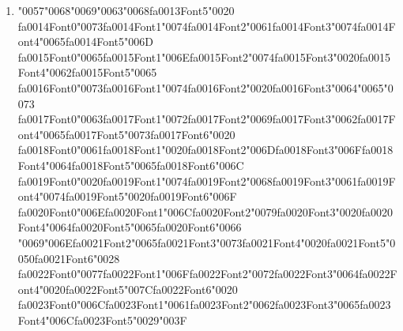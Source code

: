 \documentclass[11pt]{article}
\begin{document}
\begin{enumerate}[label=Q\arabic*., leftmargin=*]
\textbf{A.} Beginning of an entity\\
\textbf{B.} Inside an entity\\
\textbf{C.} Outside any entity\\
\textbf{D.} Between two tokens

\item {\char"0057}{\char"0068}{\char"0069}{\char"0063}{\char"0068}{\csname fa0013Font5\endcsname\char"0020} {\csname fa0014Font0\endcsname\char"0073}{\csname fa0014Font1\endcsname\char"0074}{\csname fa0014Font2\endcsname\char"0061}{\csname fa0014Font3\endcsname\char"0074}{\csname fa0014Font4\endcsname\char"0065}{\csname fa0014Font5\endcsname\char"006D} {\csname fa0015Font0\endcsname\char"0065}{\csname fa0015Font1\endcsname\char"006E}{\csname fa0015Font2\endcsname\char"0074}{\csname fa0015Font3\endcsname\char"0020}{\csname fa0015Font4\endcsname\char"0062}{\csname fa0015Font5\endcsname\char"0065} {\csname fa0016Font0\endcsname\char"0073}{\csname fa0016Font1\endcsname\char"0074}{\csname fa0016Font2\endcsname\char"0020}{\csname fa0016Font3\endcsname\char"0064}{\char"0065}{\char"0073} {\csname fa0017Font0\endcsname\char"0063}{\csname fa0017Font1\endcsname\char"0072}{\csname fa0017Font2\endcsname\char"0069}{\csname fa0017Font3\endcsname\char"0062}{\csname fa0017Font4\endcsname\char"0065}{\csname fa0017Font5\endcsname\char"0073}{\csname fa0017Font6\endcsname\char"0020} {\csname fa0018Font0\endcsname\char"0061}{\csname fa0018Font1\endcsname\char"0020}{\csname fa0018Font2\endcsname\char"006D}{\csname fa0018Font3\endcsname\char"006F}{\csname fa0018Font4\endcsname\char"0064}{\csname fa0018Font5\endcsname\char"0065}{\csname fa0018Font6\endcsname\char"006C} {\csname fa0019Font0\endcsname\char"0020}{\csname fa0019Font1\endcsname\char"0074}{\csname fa0019Font2\endcsname\char"0068}{\csname fa0019Font3\endcsname\char"0061}{\csname fa0019Font4\endcsname\char"0074}{\csname fa0019Font5\endcsname\char"0020}{\csname fa0019Font6\endcsname\char"006F} {\csname fa0020Font0\endcsname\char"006E}{\csname fa0020Font1\endcsname\char"006C}{\csname fa0020Font2\endcsname\char"0079}{\csname fa0020Font3\endcsname\char"0020}{\csname fa0020Font4\endcsname\char"0064}{\csname fa0020Font5\endcsname\char"0065}{\csname fa0020Font6\endcsname\char"0066} {\char"0069}{\char"006E}{\csname fa0021Font2\endcsname\char"0065}{\csname fa0021Font3\endcsname\char"0073}{\csname fa0021Font4\endcsname\char"0020}{\csname fa0021Font5\endcsname\char"0050}{\csname fa0021Font6\endcsname\char"0028} {\csname fa0022Font0\endcsname\char"0077}{\csname fa0022Font1\endcsname\char"006F}{\csname fa0022Font2\endcsname\char"0072}{\csname fa0022Font3\endcsname\char"0064}{\csname fa0022Font4\endcsname\char"0020}{\csname fa0022Font5\endcsname\char"007C}{\csname fa0022Font6\endcsname\char"0020} {\csname fa0023Font0\endcsname\char"006C}{\csname fa0023Font1\endcsname\char"0061}{\csname fa0023Font2\endcsname\char"0062}{\csname fa0023Font3\endcsname\char"0065}{\csname fa0023Font4\endcsname\char"006C}{\csname fa0023Font5\endcsname\char"0029}{\char"003F}\\[0.25em]

\end{enumerate}
\end{document}
